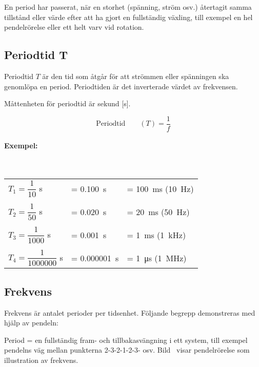 En period har passerat, när en storhet (spänning, ström osv.) återtagit samma
tillstånd eller värde efter att ha gjort en fullständig växling, till exempel en hel
pendelrörelse eller ett helt varv vid rotation.

\newpage
\subsection{Periodtid T}

Periodtid \(T\) är den tid som åtgår för att strömmen eller spänningen ska
genomlöpa en period. Periodtiden är det inverterade värdet av frekvensen.

Måttenheten för periodtid är sekund [s].

$$\text{Periodtid} \qquad (T) = \dfrac{1}{f}$$

\noindent
\paragraph{Exempel:}~\\[1ex]
\begin{small}
\begin{tabular}{@{}lll}
\(T_1=\dfrac{1}{10}\) s & = \qty{0,100}{\second} & = \qty{100}{\milli\second} (\qty{10}{\hertz})\\
\\
\(T_2=\dfrac{1}{50}\) s & = \qty{0,020}{\second} & = \qty{20}{\milli\second} (\qty{50}{\hertz})\\
\\
\(T_3=\dfrac{1}{1000}\) s & = \qty{0,001}{\second} & = \qty{1}{\milli\second} (\qty{1}{\kilo\hertz})\\
\\
\(T_4=\dfrac{1}{1000000}\) s & = \qty{0,000001}{\second} & = \qty{1}{\micro\second} (\qty{1}{\mega\hertz})\\
\end{tabular}
\end{small}

\subsection{Frekvens}
\label{frekvens}

Frekvens är antalet perioder per tidsenhet.
Följande begrepp demonstreras med hjälp av pendeln:

Period = en fullständig fram- och tillbakasvängning i ett system, till exempel
pendelns väg mellan punkterna 2-3-2-1-2-3- osv.
Bild~ visar pendelrörelse som illustration av frekvens.

